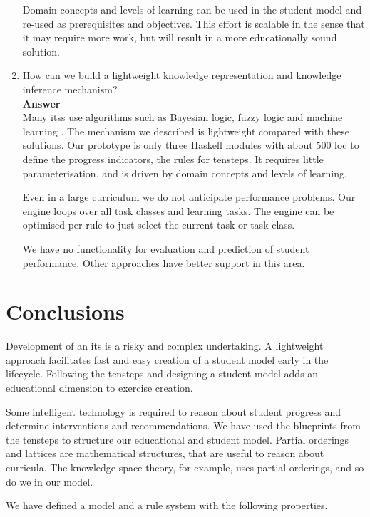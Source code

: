 \begin{enumerate}[Q1.]
Domain concepts and levels of learning can be used in the student model and re-used as prerequisites and objectives.
This effort is scalable in the sense that it may require more work, but will result in a more educationally sound solution.


\item How can we build a lightweight knowledge representation and knowledge inference mechanism?\\

\textbf{Answer}\\
Many \glspl{its} use algorithms such as Bayesian logic, fuzzy logic and machine learning \citep{chrysafiadi_2013}.
The mechanism we described is lightweight compared with these solutions.
Our prototype is only three Haskell modules with about 500 \gls{loc} to define the progress indicators, the rules for \gls{tensteps}.
It requires little parameterisation, and is driven by domain concepts and levels of learning.

Even in a large curriculum we do not anticipate performance problems.
Our engine loops over all task classes and learning tasks.
The engine can be optimised  per rule to just select the current task or task class.

We have no functionality for evaluation and prediction of student performance.
Other approaches have better support in this area.

\end{enumerate}

\section{Conclusions}

Development of an \gls{its} is a risky and complex undertaking.
A lightweight approach facilitates fast and easy creation of a student model early in the lifecycle.
Following the \gls{tensteps} and designing a student model adds an educational dimension to exercise creation. 

Some intelligent technology is required to reason about student progress and determine interventions and recommendations.
We have used the blueprints from the \gls{tensteps} to structure our educational and student model.
Partial orderings and lattices are mathematical structures, that are useful to reason about curricula. 
The knowledge space theory, for example, uses partial orderings, and so do we in our model.

We have defined a model and a rule system with the following properties.

